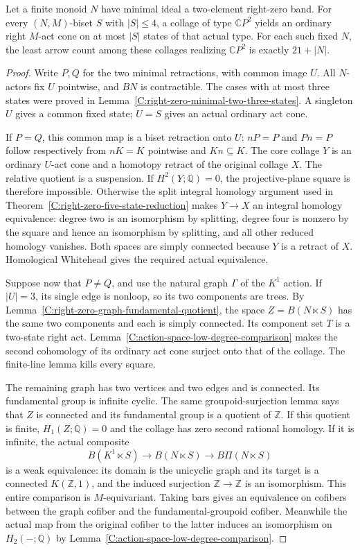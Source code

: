 \begin{theorem}
\label{C:right-zero-minimal-two-four-states}
Let a finite monoid $N$ have minimal ideal a two-element
right-zero band. For every $(N,M)$-biset $S$ with $|S|\leq4$,
a collage of type $\mathbb CP^2$ yields an ordinary right
$M$-act cone on at most $|S|$ states of that actual type.
For each such fixed $N$, the least arrow count among these
collages realizing $\mathbb CP^2$ is exactly $21+|N|$.
\end{theorem}
\begin{proof}
Write $P,Q$ for the two minimal retractions, with common
image $U$. All $N$-actors fix $U$ pointwise, and $BN$ is
contractible. The cases with at most three states were proved
in Lemma~\ref{C:right-zero-minimal-two-three-states}.
A singleton $U$ gives a common fixed state; $U=S$ gives an
actual ordinary act cone.

If $P=Q$, this common map is a biset retraction onto $U$:
$nP=P$ and $Pn=P$ follow respectively from $nK=K$
pointwise and $Kn\subseteq K$. The core collage $Y$ is an
ordinary $U$-act cone and a homotopy retract of the original
collage $X$. The relative quotient is a suspension.
If $H^2(Y;\mathbb Q)=0$, the projective-plane square is
therefore impossible. Otherwise the split integral homology
argument used in Theorem~\ref{C:right-zero-five-state-reduction}
makes $Y\to X$ an integral homology equivalence: degree two
is an isomorphism by splitting, degree four is nonzero by the
square and hence an isomorphism by splitting, and all other
reduced homology vanishes. Both spaces are simply connected
because $Y$ is a retract of $X$. Homological Whitehead gives
the required actual equivalence.

Suppose now that $P\ne Q$, and use the natural graph $\Gamma$
of the $K^1$ action. If $|U|=3$, its single edge is nonloop,
so its two components are trees. By
Lemma~\ref{C:right-zero-graph-fundamental-quotient}, the space
$Z=B(N\ltimes S)$ has the same two components and each is
simply connected. Its component set $T$ is a two-state right
act. Lemma~\ref{C:action-space-low-degree-comparison} makes
the second cohomology of its ordinary act cone surject onto
that of the collage. The finite-line lemma kills every square.

The remaining graph has two vertices and two edges and is
connected. Its fundamental group is infinite cyclic. The
same groupoid-surjection lemma says that $Z$ is connected
and its fundamental group is a quotient of $\mathbb Z$.
If this quotient is finite, $H_1(Z;\mathbb Q)=0$ and the
collage has zero second rational homology. If it is infinite,
the actual composite
\[
 B(K^1\ltimes S)\longrightarrow B(N\ltimes S)
       \longrightarrow B\Pi(N\ltimes S)
\]
is a weak equivalence: its domain is the unicyclic graph and
its target is a connected $K(\mathbb Z,1)$, and the induced
surjection $\mathbb Z\to\mathbb Z$ is an isomorphism.
This entire comparison is $M$-equivariant. Taking bars gives
an equivalence on cofibers between the graph cofiber and the
fundamental-groupoid cofiber. Meanwhile the actual map from
the original cofiber to the latter induces an isomorphism on
$H_2(-;\mathbb Q)$ by
Lemma~\ref{C:action-space-low-degree-comparison}.


\end{proof}

